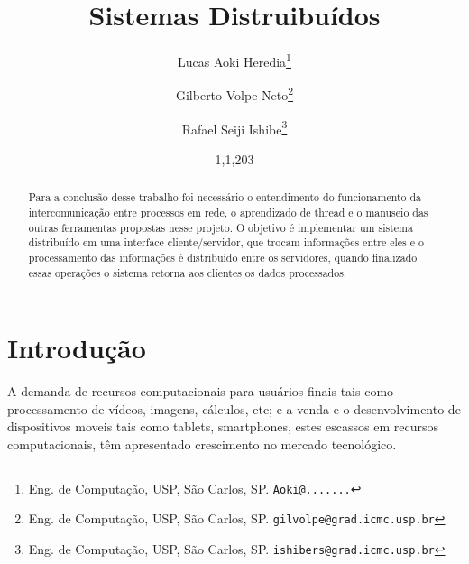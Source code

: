 \documentclass[12pt,a4paper]{article}
\begin{document}

%
\pagestyle{myheadings}
\date{1,1,203}
\thispagestyle{empty}

%
\title{Sistemas Distruibuídos}

\author{Lucas Aoki Heredia\thanks{Eng. de Computação, USP, São Carlos, SP. \texttt{Aoki@.......}} \and
Gilberto Volpe Neto\thanks{Eng. de Computação, USP, São Carlos, SP.  \texttt{gilvolpe@grad.icmc.usp.br}} \and
Rafael Seiji Ishibe\thanks{Eng. de Computação, USP, São Carlos, SP.  \texttt{ishibers@grad.icmc.usp.br}}}

\date{}

\maketitle



\newpage
\begin{abstract} 
Para a conclusão desse trabalho foi necessário o entendimento do funcionamento da intercomunicação entre processos em rede, o aprendizado de thread e o manuseio das outras ferramentas propostas nesse projeto.
O objetivo é implementar um sistema distribuído em uma interface cliente/servidor, que trocam informações entre eles e o processamento das informações é distribuído entre os servidores, quando finalizado essas operações o sistema retorna aos clientes os dados processados.
\end{abstract}

\newpage
\section{Introdução}
A demanda de recursos computacionais para usuários finais tais como processamento de vídeos, imagens, cálculos, etc; e a venda e o desenvolvimento de dispositivos moveis tais como tablets, smartphones, estes escassos em recursos computacionais, têm apresentado crescimento no mercado tecnológico.
\end{document}

